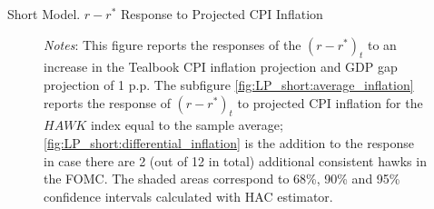 \documentclass[10pt,aspectratio=169]{beamer}
\begin{document}
\begin{frame}{Short Model. $r-r^*$ Response to Projected CPI Inflation}
\begin{figure}[!htbp]
\begin{minipage}{1\textwidth}
\begin{subfigure}[b]{0.495\textwidth}
          \end{subfigure}\vspace{-2ex}
              {\begin{flushleft}\tiny\textit{Notes}: This figure reports the responses of the $(r-r^*)_t$ to an increase in the Tealbook CPI inflation projection and GDP gap projection of 1 p.p. The subfigure \ref{fig:LP_short:average_inflation} reports the response of $(r-r^*)_t$ to projected CPI inflation for the $\mathit{HAWK}$ index equal to the sample average; \ref{fig:LP_short:differential_inflation} is the addition to the response in case there are 2 (out of 12 in total) additional consistent hawks in the FOMC. The shaded areas correspond to 68\%, 90\% and 95\% confidence intervals calculated with \cite{Andrews1991} HAC estimator.\end{flushleft}}
        \end{minipage}
      \end{figure}
\end{frame}

\end{document}
